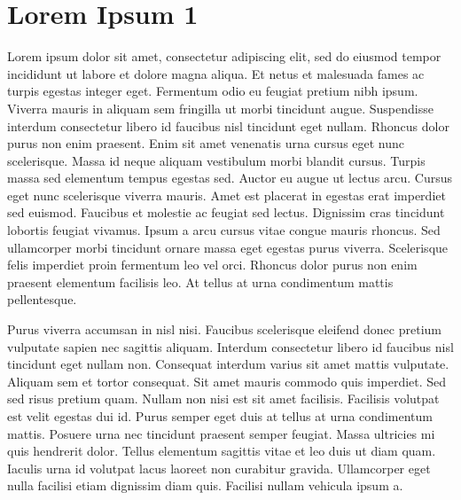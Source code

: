 \documentclass[a4paper,12pt,twoside,openright]{report}
\begin{document}
\renewcommand{\chaptermark}[1]{\markboth{\thechapter. #1}{}} %
\renewcommand{\sectionmark}[1]{\markright{\thesection. #1}} %

\newpage





\chapter{Lorem Ipsum 1 \label{capitulouno}}

Lorem ipsum dolor sit amet, consectetur adipiscing elit, sed do eiusmod tempor incididunt ut labore et dolore magna aliqua. Et netus et malesuada fames ac turpis egestas integer eget. Fermentum odio eu feugiat pretium nibh ipsum. Viverra mauris in aliquam sem fringilla ut morbi tincidunt augue. Suspendisse interdum consectetur libero id faucibus nisl tincidunt eget nullam. Rhoncus dolor purus non enim praesent. Enim sit amet venenatis urna cursus eget nunc scelerisque. Massa id neque aliquam vestibulum morbi blandit cursus. Turpis massa sed elementum tempus egestas sed. Auctor eu augue ut lectus arcu. Cursus eget nunc scelerisque viverra mauris. Amet est placerat in egestas erat imperdiet sed euismod. Faucibus et molestie ac feugiat sed lectus. Dignissim cras tincidunt lobortis feugiat vivamus. Ipsum a arcu cursus vitae congue mauris rhoncus. Sed ullamcorper morbi tincidunt ornare massa eget egestas purus viverra. Scelerisque felis imperdiet proin fermentum leo vel orci. Rhoncus dolor purus non enim praesent elementum facilisis leo. At tellus at urna condimentum mattis pellentesque.

Purus viverra accumsan in nisl nisi. Faucibus scelerisque eleifend donec pretium vulputate sapien nec sagittis aliquam. Interdum consectetur libero id faucibus nisl tincidunt eget nullam non. Consequat interdum varius sit amet mattis vulputate. Aliquam sem et tortor consequat. Sit amet mauris commodo quis imperdiet. Sed sed risus pretium quam. Nullam non nisi est sit amet facilisis. Facilisis volutpat est velit egestas dui id. Purus semper eget duis at tellus at urna condimentum mattis. Posuere urna nec tincidunt praesent semper feugiat. Massa ultricies mi quis hendrerit dolor. Tellus elementum sagittis vitae et leo duis ut diam quam. Iaculis urna id volutpat lacus laoreet non curabitur gravida. Ullamcorper eget nulla facilisi etiam dignissim diam quis. Facilisi nullam vehicula ipsum a.
\end{document}
